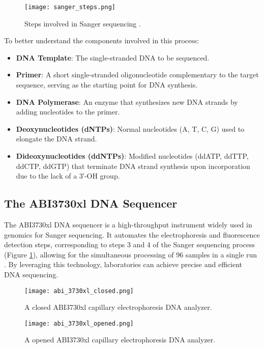 \begin{figure}[H]
\centering
\texttt{[image: sanger\_steps.png]}
\caption{Steps involved in Sanger sequencing \cite{biotechreality_sanger_steps}.}
\label{fig:sanger_steps}
\end{figure}

To better understand the components involved in this process:
\begin{itemize}
    \item \textbf{DNA Template}: The single-stranded DNA to be sequenced.
    \item \textbf{Primer}: A short single-stranded oligonucleotide complementary to the target sequence, serving as the starting point for DNA synthesis.
    \item \textbf{DNA Polymerase}: An enzyme that synthesizes new DNA strands by adding nucleotides to the primer.
    \item \textbf{Deoxynucleotides (dNTPs)}: Normal nucleotides (A, T, C, G) used to elongate the DNA strand.
    \item \textbf{Dideoxynucleotides (ddNTPs)}: Modified nucleotides (ddATP, ddTTP, ddCTP, ddGTP) that terminate DNA strand synthesis upon incorporation due to the lack of a 3′-OH group.
\end{itemize}

\subsection{The ABI3730xl DNA Sequencer}
The ABI3730xl DNA sequencer is a high-throughput instrument widely used in genomics for Sanger sequencing. It automates the electrophoresis and fluorescence detection steps, corresponding to steps 3 and 4 of the Sanger sequencing process (Figure \ref{fig:sanger_steps}), allowing for the simultaneous processing of 96 samples in a single run \cite{smith_capillary_sequencing,abi3730xl_overview}. By leveraging this technology, laboratories can achieve precise and efficient DNA sequencing. 
\begin{figure}[h]
\centering
\texttt{[image: abi\_3730xl\_closed.png]}
\caption{A closed ABI3730xl capillary electrophoresis DNA analyzer.}
\label{fig:abi_3730xl_closed}
\end{figure}

\begin{figure}[h]
\centering
\texttt{[image: abi\_3730xl\_opened.png]}
\caption{A opened ABI3730xl capillary electrophoresis DNA analyzer.}
\label{fig:abi_3730xl_opened}
\end{figure}



